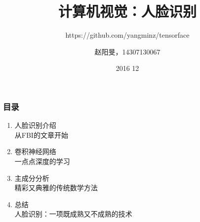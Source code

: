 \documentclass[24pt]{beamer}
\title{计算机视觉：人脸识别}
\subtitle{https://github.com/yangminz/tensorface}
\author{赵阳旻，14307130067}
\date{2016 12}
\begin{document}
\setcounter{showProgressBar}{0}
\setcounter{showSlideNumbers}{0}

\frame{\titlepage}
\begin{frame}
\frametitle{目录}
\begin{enumerate}
\item 人脸识别介绍 \\ \textcolor{ExecusharesGrey}{\footnotesize\hspace{1em} 从FBI的文章开始}
\item 卷积神经网络  \\ \textcolor{ExecusharesGrey}{\footnotesize\hspace{1em} 一点点深度的学习}
\item 主成分分析  \\ \textcolor{ExecusharesGrey}{\footnotesize\hspace{1em} 精彩又典雅的传统数学方法}
\item 总结 \\ \textcolor{ExecusharesGrey}{\footnotesize\hspace{1em} 人脸识别：一项既成熟又不成熟的技术}
\end{enumerate}
\end{frame}
\setcounter{framenumber}{0}
\setcounter{showProgressBar}{1}
\setcounter{showSlideNumbers}{1}
\end{document}
